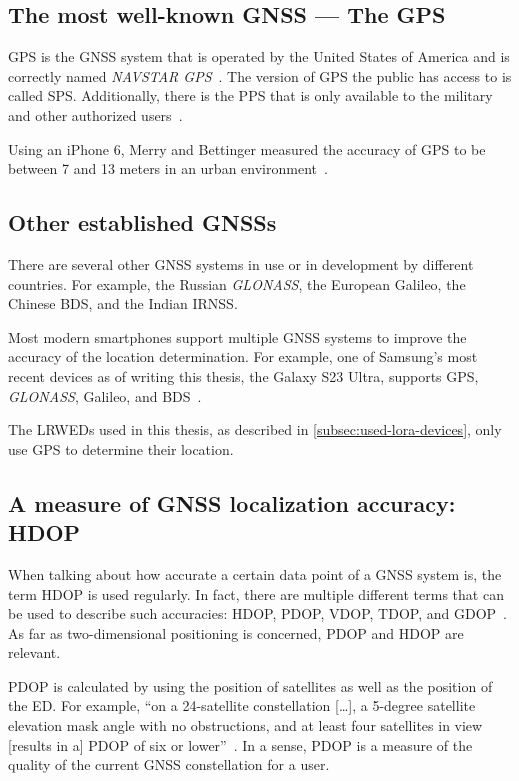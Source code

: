 \subsection{The most well-known \acl{GNSS} — The \acl{GPS}}

\ac{GPS} is the \ac{GNSS} system that is operated by the United States of America and is correctly named \emph{NAVSTAR \ac{GPS}}~\cite{department_of_defense_usa_gps_2020}.
The version of GPS the public has access to is called \acf{SPS}.
Additionally, there is the \acf{PPS} that is only available to the military and other authorized users~\cite{department_of_defense_usa_gps_2007}.

Using an iPhone 6, Merry and Bettinger measured the accuracy of \ac{GPS} to be between 7 and 13 meters in an urban environment~\cite{merry_smartphone_2019}.

\subsection{Other established \aclp{GNSS}}

There are several other \ac{GNSS} systems in use or in development by different countries.
For example, the Russian \emph{GLONASS}, the European Galileo, the Chinese \acf{BDS}, and the Indian \acf{IRNSS}.

Most modern smartphones support multiple \ac{GNSS} systems to improve the accuracy of the location determination.
For example, one of Samsung's most recent devices as of writing this thesis, the Galaxy S23 Ultra, supports \ac{GPS}, \emph{GLONASS}, Galileo, and \ac{BDS}~\cite{gsmarena_samsung_2023}.

The \aclp{LRWED} used in this thesis, as described in \cref{subsec:used-lora-devices}, only use \ac{GPS} to determine their location.

\subsection{A measure of \acl{GNSS} localization accuracy: \acl{HDOP}}

When talking about how accurate a certain data point of a \ac{GNSS} system is, the term \ac{HDOP} is used regularly.
In fact, there are multiple different terms that can be used to describe such accuracies: \ac{HDOP}, \ac{PDOP}, \ac{VDOP}, \ac{TDOP}, and \ac{GDOP}~\cite{langley_dilution_1999}.
As far as two-dimensional positioning is concerned, \ac{PDOP} and \ac{HDOP} are relevant.

\ac{PDOP} is calculated by using the position of satellites as well as the position of the \acl{ED}.
For example, ``on a 24-satellite constellation […], a 5-degree satellite elevation mask angle with no obstructions, and at least four satellites in view [results in a] \acf{PDOP} of six or lower''~\cite{langley_dilution_1999}.
In a sense, \ac{PDOP} is a measure of the quality of the current \ac{GNSS} constellation for a user.


